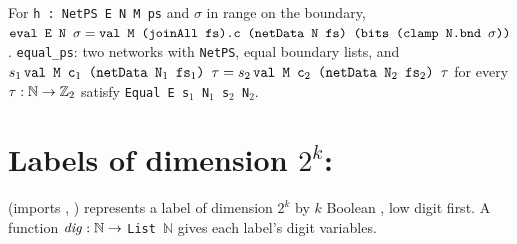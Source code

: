 \begin{theorem}
For \textnormal{\texttt{h : NetPS E N M ps}} and $\sigma$ in range on the boundary,
$\textnormal{\texttt{eval E N \ensuremath{\sigma}}} = \textnormal{\texttt{val M (\allowbreak{}joinAll fs).\allowbreak{}c (\allowbreak{}netData N fs) (\allowbreak{}bits (\allowbreak{}clamp N.\allowbreak{}bnd \ensuremath{\sigma}))}}$.
\textnormal{\texttt{equal\_\allowbreak{}ps}}: two networks with \textnormal{\texttt{NetPS}}, equal boundary lists, and
$s_1\,\textnormal{\texttt{val M c\ensuremath{_1} (\allowbreak{}netData N\ensuremath{_1} fs\ensuremath{_1}) \ensuremath{\tau}}} = s_2\,\textnormal{\texttt{val M c\ensuremath{_2} (\allowbreak{}netData N\ensuremath{_2} fs\ensuremath{_2}) \ensuremath{\tau}}}$ for every
$\tau:\mathbb{N}\to\mathbb{Z}_{2}$ satisfy \textnormal{\texttt{Equal E s\ensuremath{_1} N\ensuremath{_1} s\ensuremath{_2} N\ensuremath{_2}}}.
\end{theorem}

\section{Labels of dimension \texorpdfstring{$2^k$}{2\^{}k}: \texorpdfstring{}{PathSumDigits}}\label{sec:lean-pathsum-digits}

 (imports , ) represents a label of
dimension $2^k$ by $k$ Boolean , low digit first. A function
$\mathit{dig}:\mathbb{N}\to$ \textnormal{\texttt{List \ensuremath{\mathbb{N}}}} gives each label's digit variables.

